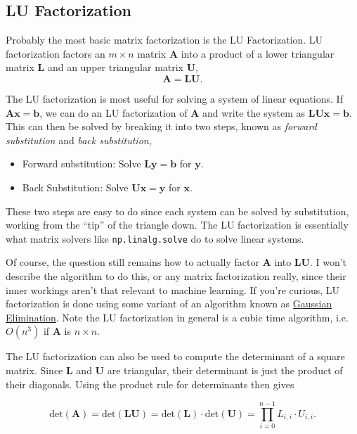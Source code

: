\documentclass[
  letterpaper,
  DIV=11,
  numbers=noendperiod]{scrreprt}
\providecommand{\tightlist}{%
  \setlength{\itemsep}{0pt}\setlength{\parskip}{0pt}}\usepackage{longtable,booktabs,array}
\begin{document}
\hypertarget{lu-factorization}{%
\subsection{LU Factorization}\label{lu-factorization}}

Probably the most basic matrix factorization is the LU Factorization. LU
factorization factors an \(m \times n\) matrix \(\mathbf{A}\) into a
product of a lower triangular matrix \(\mathbf{L}\) and an upper
triangular matrix \(\mathbf{U}\), \[\mathbf{A} = \mathbf{L}\mathbf{U}.\]

The LU factorization is most useful for solving a system of linear
equations. If \(\mathbf{A}\mathbf{x}=\mathbf{b}\), we can do an LU
factorization of \(\mathbf{A}\) and write the system as
\(\mathbf{LUx} = \mathbf{b}\). This can then be solved by breaking it
into two steps, known as \emph{forward substitution} and \emph{back
substitution},

\begin{itemize}
\tightlist
\item
  Forward substitution: Solve \(\mathbf{Ly} = \mathbf{b}\) for
  \(\mathbf{y}\).
\item
  Back Substitution: Solve \(\mathbf{Ux} = \mathbf{y}\) for
  \(\mathbf{x}\).
\end{itemize}

These two steps are easy to do since each system can be solved by
substitution, working from the ``tip'' of the triangle down. The LU
factorization is essentially what matrix solvers like
\texttt{np.linalg.solve} do to solve linear systems.

Of course, the question still remains how to actually factor
\(\mathbf{A}\) into \(\mathbf{L}\mathbf{U}\). I won't describe the
algorithm to do this, or any matrix factorization really, since their
inner workings aren't that relevant to machine learning. If you're
curious, LU factorization is done using some variant of an algorithm
known as
\href{https://en.wikipedia.org/wiki/Gaussian_elimination}{Gaussian
Elimination}. Note the LU factorization in general is a cubic time
algorithm, i.e.~\(O(n^3)\) if \(\mathbf{A}\) is \(n \times n\).

The LU factorization can also be used to compute the determinant of a
square matrix. Since \(\mathbf{L}\) and \(\mathbf{U}\) are triangular,
their determinant is just the product of their diagonals. Using the
product rule for determinants then gives

\[\text{det}(\mathbf{A}) = \text{det}(\mathbf{LU}) = \text{det}(\mathbf{L}) \cdot \text{det}(\mathbf{U}) = \prod_{i=0}^{n-1} L_{i,i} \cdot U_{i,i}.\]
\end{document}
